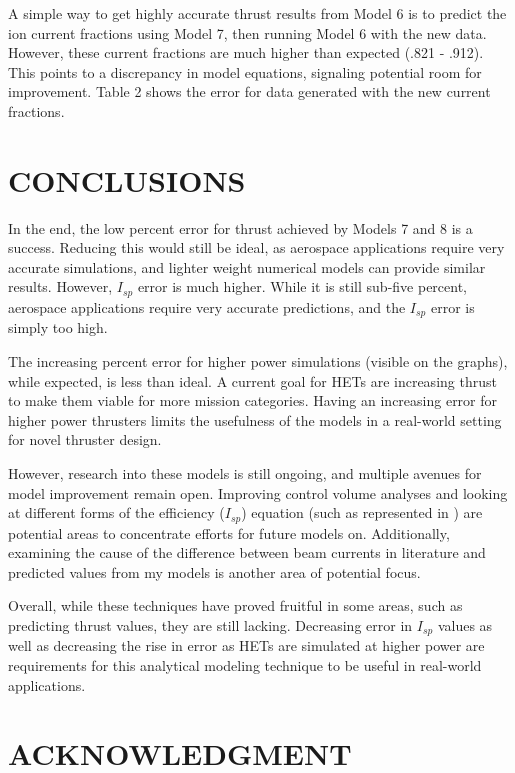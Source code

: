 \documentclass[letterpaper, 10 pt, conference]{ieeeconf}  %
\begin{document}
A simple way to get highly accurate thrust results from Model 6 is to predict the ion current fractions using Model 7, then running Model 6 with the new data. However, these current fractions are much higher than expected (.821 - .912). This points to a discrepancy in model equations, signaling potential room for improvement. Table 2 shows the error for data generated with the new current fractions.

\section{CONCLUSIONS}

In the end, the low percent error for thrust achieved by Models 7 and 8 is a success. Reducing this would still be ideal, as aerospace applications require very accurate simulations, and lighter weight numerical models can provide similar results. However, $I_{sp}$ error is much higher. While it is still sub-five percent, aerospace applications require very accurate predictions, and the $I_{sp}$ error is simply too high.

The increasing percent error for higher power simulations (visible on the graphs), while expected, is less than ideal. A current goal for HETs are increasing thrust to make them viable for more mission categories. Having an increasing error for higher power thrusters limits the usefulness of the models in a real-world setting for novel thruster design.

However, research into these models is still ongoing, and multiple avenues for model improvement remain open. Improving control volume analyses and looking at different forms of the efficiency ($I_{sp}$) equation (such as represented in \cite{c3})  are potential areas to concentrate efforts for future models on. Additionally, examining the cause of the difference between beam currents in literature and predicted values from my models is another area of potential focus.

Overall, while these techniques have proved fruitful in some areas, such as predicting thrust values, they are still lacking. Decreasing error in $I_{sp}$ values as well as decreasing the rise in error as HETs are simulated at higher power are requirements for this analytical modeling technique to be useful in real-world applications. 

\section*{ACKNOWLEDGMENT}
\end{document}

